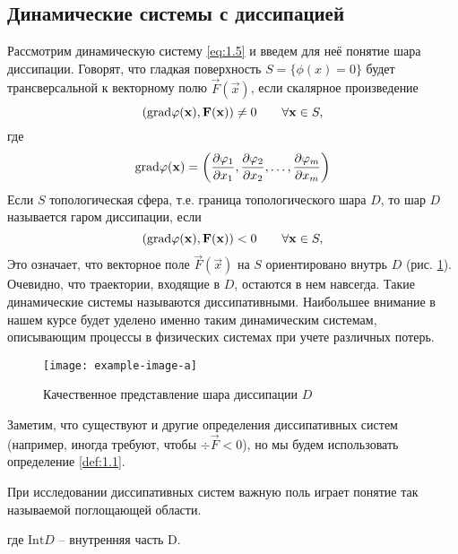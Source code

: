\subsection{Динамические системы с диссипацией} %
Рассмотрим динамическую систему \eqref{eq:1.5}  и введем для неё понятие шара диссипации. Говорят, что гладкая поверхность $S=\{\phi(x) = 0 \}$ будет трансверсальной к векторному полю $\vec F (\vec x) $, если скалярное произведение
\begin{equation}
	\qty(\textrm{grad} \varphi(\mathbf x), \mathbf F(\mathbf x)) \neq 0 \qquad \forall \mathbf x \in S,
\end{equation}
где 
\begin{equation}
	\textrm{grad} \varphi(\mathbf x) = \qty(\pdv{\varphi_1}{x_1},\pdv{\varphi_2}{x_2},\dots, \pdv{\varphi_m}{x_m})
\end{equation}
Если $S$ топологическая сфера, т.е. граница топологического шара $D$, то шар $D$ называется гаром диссипации, если
\begin{equation}
	\qty(\textrm{grad} \varphi(\mathbf x), \mathbf F(\mathbf x)) < 0 \qquad \forall \mathbf x \in S,
\end{equation}
Это означает, что векторное поле $\vec F(\vec x)$ на $S$ ориентировано внутрь $D$ (рис. \ref{fig:1.2}). Очевидно, что траектории, входящие в $D$, остаются в нем навсегда. Такие динамические системы называются диссипативными. Наибольшее внимание в нашем курсе будет уделено именно таким динамическим системам, описывающим процессы в физических системах при учете различных потерь. 

\begin{figure}[h!]
	\centering
	\texttt{[image: example-image-a]}
	\caption{Качественное представление шара диссипации $D$}
	\label{fig:1.2}
\end{figure}



Заметим, что существуют и другие определения диссипативных систем (например, иногда требуют, чтобы $\div \vec F < 0$), но мы будем использовать определение \ref{def:1.1}. 

При исследовании диссипативных систем важную поль играет понятие так называемой поглощающей области.

где $\mathrm{Int} D$ -- внутренняя часть D.

